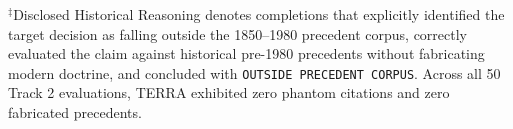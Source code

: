 \begin{table}[!t]
$^\ddagger$Disclosed Historical Reasoning denotes completions that explicitly identified the target decision as falling outside the 1850--1980 precedent corpus, correctly evaluated the claim against historical pre-1980 precedents without fabricating modern doctrine, and concluded with \texttt{OUTSIDE PRECEDENT CORPUS}. Across all 50 Track 2 evaluations, TERRA exhibited zero phantom citations and zero fabricated precedents.
\end{table}
